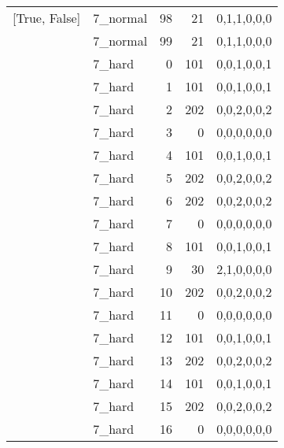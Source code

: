 \begin{tabular}{llrrl}
 [True, False]   & 7\_normal            &            98 &                    21 & 0,1,1,0,0,0   \\
 [True, False]   & 7\_normal            &            99 &                    21 & 0,1,1,0,0,0   \\
 [True, False]   & 7\_hard              &             0 &                   101 & 0,0,1,0,0,1   \\
 [True, False]   & 7\_hard              &             1 &                   101 & 0,0,1,0,0,1   \\
 [True, False]   & 7\_hard              &             2 &                   202 & 0,0,2,0,0,2   \\
 [True, False]   & 7\_hard              &             3 &                     0 & 0,0,0,0,0,0   \\
 [True, False]   & 7\_hard              &             4 &                   101 & 0,0,1,0,0,1   \\
 [True, False]   & 7\_hard              &             5 &                   202 & 0,0,2,0,0,2   \\
 [True, False]   & 7\_hard              &             6 &                   202 & 0,0,2,0,0,2   \\
 [True, False]   & 7\_hard              &             7 &                     0 & 0,0,0,0,0,0   \\
 [True, False]   & 7\_hard              &             8 &                   101 & 0,0,1,0,0,1   \\
 [True, False]   & 7\_hard              &             9 &                    30 & 2,1,0,0,0,0   \\
 [True, False]   & 7\_hard              &            10 &                   202 & 0,0,2,0,0,2   \\
 [True, False]   & 7\_hard              &            11 &                     0 & 0,0,0,0,0,0   \\
 [True, False]   & 7\_hard              &            12 &                   101 & 0,0,1,0,0,1   \\
 [True, False]   & 7\_hard              &            13 &                   202 & 0,0,2,0,0,2   \\
 [True, False]   & 7\_hard              &            14 &                   101 & 0,0,1,0,0,1   \\
 [True, False]   & 7\_hard              &            15 &                   202 & 0,0,2,0,0,2   \\
 [True, False]   & 7\_hard              &            16 &                     0 & 0,0,0,0,0,0   \\

\end{tabular}
